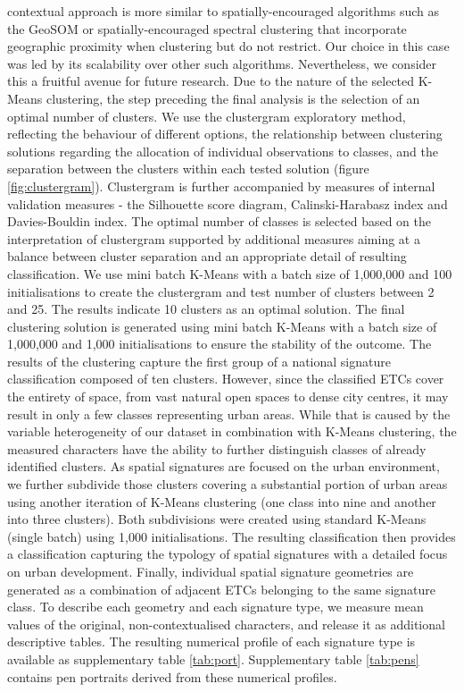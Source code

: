 \documentclass[fleqn,10pt]{wlscirep}
\begin{document}
contextual approach is more similar to spatially-encouraged algorithms such as the
GeoSOM\cite{baccao2005self} or spatially-encouraged spectral clustering\cite{wolf2021spatially} that incorporate geographic proximity when
clustering but do not restrict. Our choice in this case was led by its
scalability over other such algorithms.
Nevertheless, we consider this a fruitful avenue for future research.
Due to the nature of the selected K-Means clustering, the step preceding the final
analysis is the selection of an optimal number of clusters. We use the
clustergram exploratory method\cite{schonlau2002clustergram}, reflecting the behaviour of different options, the relationship
between clustering solutions regarding the allocation of individual observations to
classes, and the separation between the clusters within each tested solution (figure \ref{fig:clustergram}).
Clustergram is further accompanied by measures of internal validation measures - the
Silhouette score diagram, Calinski-Harabasz index\cite{calinski1974} and Davies-Bouldin index\cite{davies1979cluster}. The optimal
number of classes is selected based on the interpretation of clustergram supported by
additional measures aiming at a balance between cluster separation and an appropriate
detail of resulting classification. We use mini batch K-Means with a batch size of 1,000,000
and 100 initialisations to create the clustergram and test number of clusters between 2 and
25. The results indicate 10 clusters as an optimal solution. The final clustering solution
is generated using mini batch K-Means with a batch size of 1,000,000 and 1,000 initialisations
to ensure the stability of the outcome.
The results of the clustering capture the first group of a national signature
classification composed of ten clusters. However, since the classified ETCs
cover the entirety of space, from vast
natural open spaces to dense city centres, it may result in only a few classes
representing urban areas. While that is caused by the variable heterogeneity of our
dataset in combination with K-Means clustering, the measured characters have the ability
to further distinguish classes of already identified clusters. As spatial signatures
are focused on the urban environment, we further subdivide those clusters covering
a substantial portion of urban areas using another iteration of K-Means clustering
(one class into nine and another into three clusters). Both subdivisions were created using
standard K-Means (single batch) using 1,000 initialisations.
The resulting classification then provides a classification capturing the typology of
spatial signatures with a detailed focus on urban development.
Finally, individual spatial signature geometries are generated as a combination of
adjacent ETCs belonging to the same signature class. To describe each geometry and
each signature type, we measure mean values of the original, non-contextualised
characters, and release it as additional descriptive tables. The resulting numerical
profile of each signature type is available as supplementary table \ref{tab:port}. Supplementary table \ref{tab:pens} contains pen portraits
derived from these numerical profiles.
\end{document}
